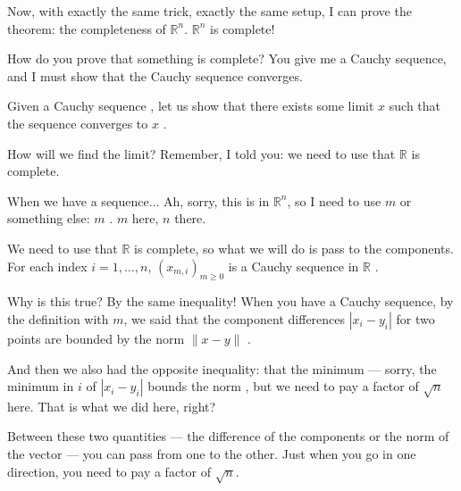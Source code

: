 \begin{proofWrapper}

\begin{speech}[01:14:32 - 01:16:07]
Now, with exactly the same trick, exactly the same setup, I can prove the theorem: the completeness of $\mathbb{R}^n$. $\mathbb{R}^n$ is complete! 

How do you prove that something is complete? You give me a Cauchy sequence, and I must show that the Cauchy sequence converges.

Given a Cauchy sequence , let us show that there exists some limit $x$ such that the sequence converges to $x$ .

How will we find the limit? Remember, I told you: we need to use that $\mathbb{R}$ is complete.

When we have a sequence... Ah, sorry, this is in $\mathbb{R}^n$, so I need to use $m$ or something else: $m$ . $m$ here, $n$ there.
\end{speech}

\begin{speech}[01:16:07 - 01:17:55]
We need to use that $\mathbb{R}$ is complete, so what we will do is pass to the components. For each index $i = 1, \dots, n$, $(x_{m,i})_{m \ge 0}$ is a Cauchy sequence in $\mathbb{R}$ .

Why is this true? By the same inequality! When you have a Cauchy sequence, by the definition with $m$, we said that the component differences $|x_i - y_i|$ for two points are bounded by the norm $\|x - y\|$ .

And then we also had the opposite inequality: that the minimum --- sorry, the minimum in $i$ of $|x_i - y_i|$ bounds the norm , but we need to pay a factor of $\sqrt{n}$ here. That is what we did here, right?
\end{speech}

\begin{speech}[01:17:55 - 01:19:37]
Between these two quantities --- the difference of the components or the norm of the vector --- you can pass from one to the other. Just when you go in one direction, you need to pay a factor of $\sqrt{n}$.


\end{speech}
\end{proofWrapper}
